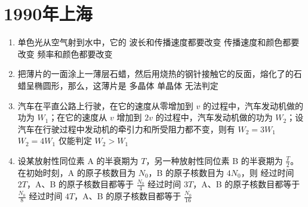 \documentclass[\gkver]{gaokaozhenti}
\begin{document}
\chapter{1990年上海}

\begin{enumerate}
\item
单色光从空气射到水中，它的
{波长和传播速度都要改变}
{传播速度和颜色都要改变}
{频率和颜色都要改变}

\item
把薄片的一面涂上一薄层石蜡，然后用烧热的钢针接触它的反面，熔化了的石蜡呈椭圆形，那么，这薄片是
{多晶体}
{单晶体}
{无法判定}

\item
汽车在平直公路上行驶，在它的速度从零增加到 $v$ 的过程中，汽车发动机做的功为 $W_{1}$；在它的速度从 $v$ 增加到 $2v$ 的过程中，汽车发动机做的功为 $W_{2}$；设汽车在行驶过程中发动机的牵引力和所受阻力都不变，则有
{$W_{2}=3W_{1}$}
{$W_{2}=4W_{1}$}
{仅能判定 $W_{2}>W_{1}$}

\item
设某放射性同位素 A 的半衰期为 $T$，另一种放射性同位素 B 的半衰期为 $\frac{T}{2}$。在初始时刻，A 的原子核数目为 $N_{0}$，B 的原子核数目为 $4N_{0}$，则
{经过时间 $2T$，A、B 的原子核数目都等于 $\frac{N_{0}}{4}$}
{经过时间 $3T$，A、B 的原子核数目都等于 $\frac{N_{0}}{8}$}
{经过时间 $4T$，A、B 的原子核数目都等于 $\frac{N_{0}}{16}$}
\end{enumerate}
\end{document}
